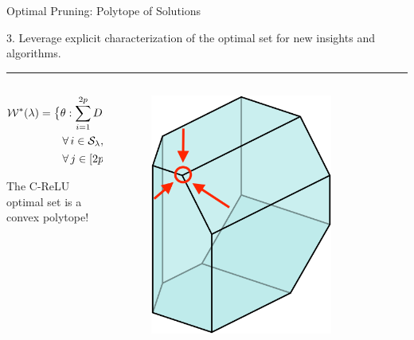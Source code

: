 \documentclass[usenames,dvipsnames,mathserif,notheorems]{beamer}
\newcommand{\horizontalrule}{
	{
			\vspace{-0.5em}
			\center \rule{\textwidth}{0.1em}
			\vspace{-0.2em}
		}
}
\newcommand{\good}[1]{\textcolor{good}{#1}}
\begin{document}
\begin{frame}{Optimal Pruning: Polytope of Solutions}

	{\raggedright
		\large
		3. Leverage explicit characterization of the optimal
		set for \good{new insights and algorithms}.
		\pause
	}

	\horizontalrule

	\begin{columns}
		\begin{column}{0.5\textwidth}

			\begin{equation*}
				\begin{aligned}
					 & \mathcal{W}^*(\lambda) =
					\big\{ \theta  : \sum_{i=1}^{2p} D_i X \theta_i = \hat y,      \\
					 & \hspace{5em} \forall \, {i}  \in  \mathcal{S}_\lambda,
					\theta_i =  \alpha_{i} q_i, \alpha_{i} \geq 0, \,              \\
					 & \hspace{5em} \forall \, j \in [2p] \setminus \mathcal{S}_\lambda,
					\theta_{j} = 0
					\big\}
				\end{aligned}
			\end{equation*}

			\pause
			The C-ReLU optimal set is a \good{convex polytope}!

		\end{column}
		\begin{column}{0.5\textwidth}
			\pause
			\begin{figure}[c]
				\centering
				\includegraphics[width=0.8\textwidth]{assets/polytope.png}
				\caption{}
				\label{fig:}
			\end{figure}
		\end{column}
	\end{columns}

\end{frame}
\end{document}
